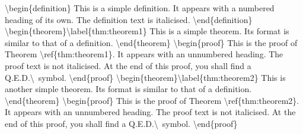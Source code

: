 \documentclass[twoside,openany]{thesis}
\begin{document}
{\ttfamily
    \textbackslash begin\{definition\}\linebreak
    This is a simple definition.\linebreak
    It appears with a numbered heading of its own.\linebreak
    The definition text is italicised.\linebreak
    \textbackslash end\{definition\}\linebreak
    \linebreak
    \textbackslash begin\{theorem\}\textbackslash label\{thm:theorem1\}\linebreak
    This is a simple theorem.\linebreak
    Its format is similar to that of a definition.\linebreak
    \textbackslash end\{theorem\}\linebreak
    \linebreak
    \textbackslash begin\{proof\}\linebreak
    This is the proof of Theorem \textbackslash ref\{thm:theorem1\}.\linebreak
    It appears with an unnumbered heading.\linebreak
    The proof text is not italicised.\linebreak
    At the end of this proof, you shall find a Q.E.D.\textbackslash \ symbol.\linebreak
    \textbackslash end\{proof\}\linebreak
    \linebreak
    \textbackslash begin\{theorem\}\textbackslash label\{thm:theorem2\}\linebreak
    This is another simple theorem.\linebreak
    Its format is similar to that of a definition.\linebreak
    \textbackslash end\{theorem\}\linebreak
    \linebreak
    \textbackslash begin\{proof\}\linebreak
    This is the proof of Theorem \textbackslash ref\{thm:theorem2\}.\linebreak
    It appears with an unnumbered heading.\linebreak
    The proof text is not italicised.\linebreak
    At the end of this proof, you shall find a Q.E.D.\textbackslash \ symbol.\linebreak
    \textbackslash end\{proof\}\linebreak
}
\end{document}
